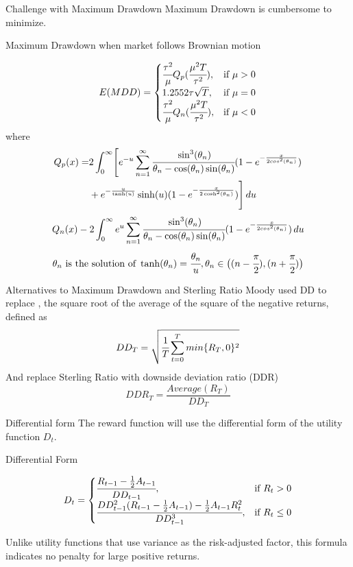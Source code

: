 \begin{frame}{Challenge with Maximum Drawdown}
Maximum Drawdown is cumbersome to minimize.
\begin{block}{Maximum Drawdown when market follows Brownian motion}

\[E(MDD)=
\begin{cases}
    \cfrac{\tau^2}{\mu}Q_p(\cfrac{\mu^2T}{\tau^2}),&\text{if  }\mu > 0\\
    1.2552 \tau \sqrt{T},& \text{if  }\mu=0 \\
    \cfrac{\tau^2}{\mu}Q_n(\cfrac{\mu^2T}{\tau^2}),&\text{if  }\mu <0
\end{cases}
\]
where
\[
\begin{aligned}
Q_p(x) = &2\int_0^\infty\Biggl[
    e^{-u}\sum_{n=1}^{\infty}
    \cfrac{\sin^3(\theta_n)}{\theta_n-\cos(\theta_n)\sin(\theta_n)}
    (1-e^{-\frac{x}{2cos^2(\theta_n)}})\\
    &+e^{-\frac{u}{\tanh(u)}}\sinh(u)
    (1-e^{-\frac{x}{2\cosh^2(\theta_n)}})
    \Biggr]\,du
\end{aligned}
\]
\[
Q_n(x)-2\int_0^\infty e^u \sum_{n=1}^{\infty}
\cfrac{\sin^3(\theta_n)}{\theta_n-\cos(\theta_n)\sin(\theta_n)}
(1-e^{-\frac{x}{2cos^2(\theta_n)}})
\,du
\]
\[
\theta_n \text{ is the solution of }
 \tanh(\theta_n) =\cfrac{\theta_n}{u},
 \theta_n \in \bigl( (n-\cfrac{\pi}{2}),(n+\cfrac{\pi}{2})\bigr)
\]
\end{block}
    
\end{frame}
\begin{frame}{Alternatives to Maximum Drawdown and  Sterling Ratio}
Moody used DD to replace , the square root of the average of the
square of the negative returns, defined as
\[
DD_T = \sqrt{\cfrac{1}{T}\sum_{t=0}^{T}{min\{R_T,0\}^2}}
\]
And replace Sterling Ratio with downside deviation ratio (DDR)
\[
DDR_T = \frac{Average(R_T)}{DD_T}
\]
\end{frame}


\begin{frame}{Differential form}
The reward function will use the differential form of the utility function \(D_t\).

\begin{block}{Differential Form}

\[
D_t = 
\begin{cases}
    \cfrac{R_{t-1} -\frac{1}{2}A_{t-1}}{DD_{t-1}},&\text{if  }R_t > 0\\
    \cfrac{DD_{t-1}^2 (R_{t-1}-\frac{1}{2}A_{t-1})  -\frac{1}{2}A_{t-1} R_t^2}{DD_{t-1}^3},&\text{if  }R_t \leq 0
\end{cases}
\]
\end{block}
Unlike utility functions that use variance as the risk-adjusted factor, this formula indicates no penalty for large positive returns. 

\end{frame}